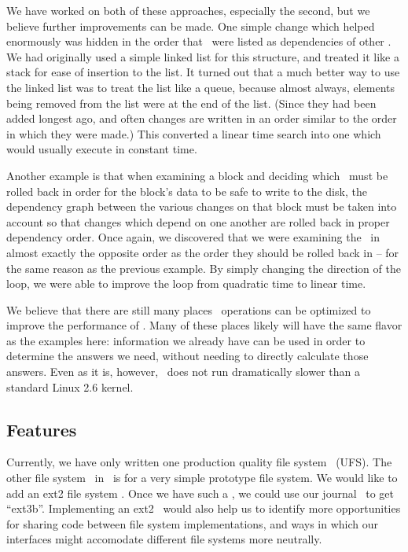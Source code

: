 We have worked on both of these approaches, especially the second, but we
believe further improvements can be made. One simple change which helped
enormously was hidden in the order that \chdescs\ were listed as dependencies of
other \chdescs. We had originally used a simple linked list for this structure,
and treated it like a stack for ease of insertion to the list. It turned out
that a much better way to use the linked list was to treat the list like a
queue, because almost always, elements being removed from the list were at the
end of the list. (Since they had been added longest ago, and often changes are
written in an order similar to the order in which they were made.) This
converted a linear time search into one which would usually execute in constant
time.

Another example is that when examining a block and deciding which \chdescs\ must
be rolled back in order for the block's data to be safe to write to the disk,
the dependency graph between the various changes on that block must be taken
into account so that changes which depend on one another are rolled back in
proper dependency order. Once again, we discovered that we were examining the
\chdescs\ in almost exactly the opposite order as the order they should be
rolled back in -- for the same reason as the previous example. By simply
changing the direction of the loop, we were able to improve the loop from
quadratic time to linear time.

We believe that there are still many places \chdesc\ operations can be optimized
to improve the performance of \Kudos. Many of these places likely will have the
same flavor as the examples here: information we already have can be used in
order to determine the answers we need, without needing to directly calculate
those answers. Even as it is, however, \Kudos\ does not run dramatically slower
than a standard Linux 2.6 kernel.


\subsection {Features}
Currently, we have only written one production quality file system \module\
(UFS). The other file system \module\ in \Kudos\ is for a very simple prototype
file system. We would like to add an ext2 file system \module. Once we have such
a \module, we could use our journal \module\ to get ``ext3b''. Implementing an
ext2 \module\ would also help us to identify more opportunities for sharing code
between file system implementations, and ways in which our interfaces might
accomodate different file systems more neutrally.

